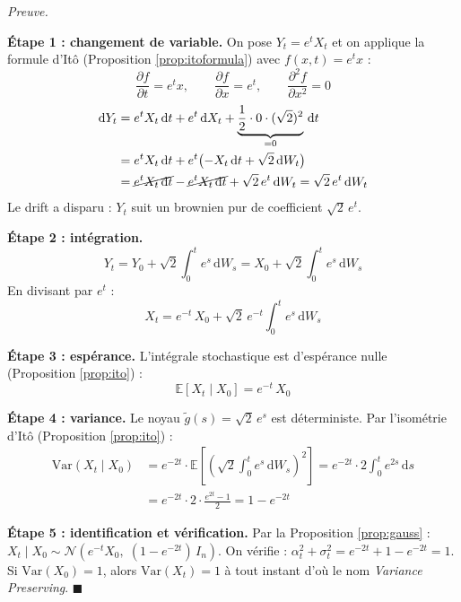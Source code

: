 \documentclass[12pt]{article}
\renewcommand{\qedsymbol}{$\blacksquare$}
\renewenvironment{proof}[1][\proofname]{%
  \par\medskip\noindent
  \textit{\color{proofgray}#1.}\enspace\ignorespaces
}{\hfill\qedsymbol\par\medskip}
\renewcommand{\proofname}{Preuve}
\begin{document}
  \begin{proof}







\textbf{Étape 1 : changement de variable.} On pose $Y_t = e^t X_t$ et on applique la formule d'Itô (Proposition \ref{prop:itoformula}) avec $f(x,t) = e^t x$ :
\[
\frac{\partial f}{\partial t} = e^t x, \qquad \frac{\partial f}{\partial x} = e^t, \qquad \frac{\partial^2 f}{\partial x^2} = 0
\]
\begin{align}
    \mathrm{d}Y_t &= e^t X_t\,\mathrm{d}t + e^t\,\mathrm{d}X_t + \underbrace{\frac{1}{2} \cdot 0 \cdot (\sqrt{2})^2}_{=0}\,\mathrm{d}t \nonumber\\
    &= e^t X_t\,\mathrm{d}t + e^t\bigl(-X_t\,\mathrm{d}t + \sqrt{2}\,\mathrm{d}W_t\bigr) \nonumber\\
    &= \cancel{e^t X_t\,\mathrm{d}t} - \cancel{e^t X_t\,\mathrm{d}t} + \sqrt{2}\, e^t\, \mathrm{d}W_t = \sqrt{2}\, e^t\, \mathrm{d}W_t
\end{align}
Le drift a disparu : $Y_t$ suit un brownien pur de coefficient $\sqrt{2}\, e^t$.

\textbf{Étape 2 : intégration.}
\[
Y_t = Y_0 + \sqrt{2}\int_0^t e^s\, \mathrm{d}W_s = X_0 + \sqrt{2}\int_0^t e^s\, \mathrm{d}W_s
\]
En divisant par $e^t$ :
\[
X_t = e^{-t}\, X_0 + \sqrt{2}\, e^{-t}\int_0^t e^s\, \mathrm{d}W_s
\]

\textbf{Étape 3 : espérance.} L'intégrale stochastique est d'espérance nulle (Proposition \ref{prop:ito}) :
\[
\mathbb{E}[X_t \mid X_0] = e^{-t}\, X_0
\]

\textbf{Étape 4 : variance.} Le noyau $\tilde{g}(s) = \sqrt{2}\, e^s$ est déterministe. Par l'isométrie d'Itô (Proposition \ref{prop:ito}) :
\begin{align}
    \mathrm{Var}(X_t \mid X_0) &= e^{-2t} \cdot \mathbb{E}\!\left[\left(\sqrt{2}\int_0^t e^s\, \mathrm{d}W_s\right)^{\!2}\right] = e^{-2t} \cdot 2\int_0^t e^{2s}\, \mathrm{d}s \nonumber\\
    &= e^{-2t} \cdot 2 \cdot \frac{e^{2t} - 1}{2} = 1 - e^{-2t}
\end{align}

\textbf{Étape 5 : identification et vérification.} Par la Proposition \ref{prop:gauss} : $X_t \mid X_0 \sim \mathcal{N}(e^{-t} X_0,\; (1-e^{-2t})\, I_n)$. On vérifie : $\alpha_t^2 + \sigma_t^2 = e^{-2t} + 1 - e^{-2t} = 1$. Si $\mathrm{Var}(X_0) = 1$, alors $\mathrm{Var}(X_t) = 1$ à tout instant d'où le nom \textit{Variance Preserving}.
\end{proof}
\end{document}
